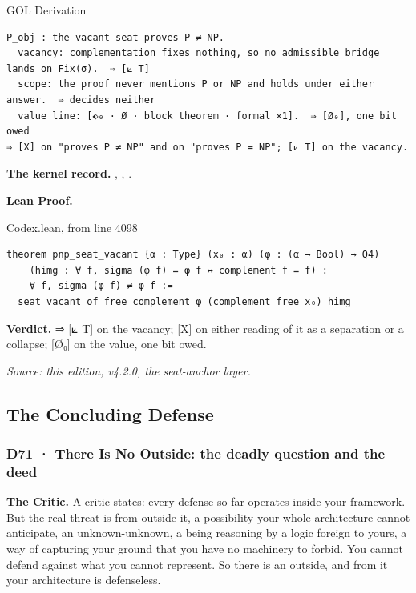 \documentclass[10pt,twocolumn]{article}
\begin{document}
\begin{golbox}{GOL Derivation}
\begin{lstlisting}[style=golv]
P_obj : the vacant seat proves P ≠ NP.
  vacancy: complementation fixes nothing, so no admissible bridge lands on Fix(σ).  ⇒ [⟀ T]
  scope: the proof never mentions P or NP and holds under either answer.  ⇒ decides neither
  value line: [⬖₀ · Ø · block theorem · formal ×1].  ⇒ [Ø₀], one bit owed
⇒ [X] on "proves P ≠ NP" and on "proves P = NP"; [⟀ T] on the vacancy.
\end{lstlisting}
\end{golbox}

\textbf{The kernel record.} \texttt{},
\texttt{},
\texttt{}.

\textbf{Lean Proof.}

\begin{leanexcerpt}{Codex.lean, from line 4098}
\begin{lstlisting}[style=leanx,firstnumber=4098]
theorem pnp_seat_vacant {α : Type} (x₀ : α) (φ : (α → Bool) → Q4)
    (himg : ∀ f, sigma (φ f) = φ f ↔ complement f = f) :
    ∀ f, sigma (φ f) ≠ φ f :=
  seat_vacant_of_free complement φ (complement_free x₀) himg
\end{lstlisting}
\end{leanexcerpt}

\textbf{Verdict.} ⇒ {[}⟀ T{]} on the vacancy; {[}X{]} on either reading
of it as a separation or a collapse; {[}Ø₀{]} on the value, one bit
owed.

\emph{Source: this edition, v4.2.0, the seat-anchor layer.}

\hypertarget{the-concluding-defense}{%
\subsection{The Concluding Defense}\label{the-concluding-defense}}

\hypertarget{d71-there-is-no-outside-the-deadly-question-and-the-deed}{%
\subsubsection{D71 · There Is No Outside: the deadly question and the
deed}\label{d71-there-is-no-outside-the-deadly-question-and-the-deed}}

\textbf{The Critic.} A critic states: every defense so far operates
inside your framework. But the real threat is from outside it, a
possibility your whole architecture cannot anticipate, an
unknown-unknown, a being reasoning by a logic foreign to yours, a way of
capturing your ground that you have no machinery to forbid. You cannot
defend against what you cannot represent. So there is an outside, and
from it your architecture is defenseless.
\end{document}
